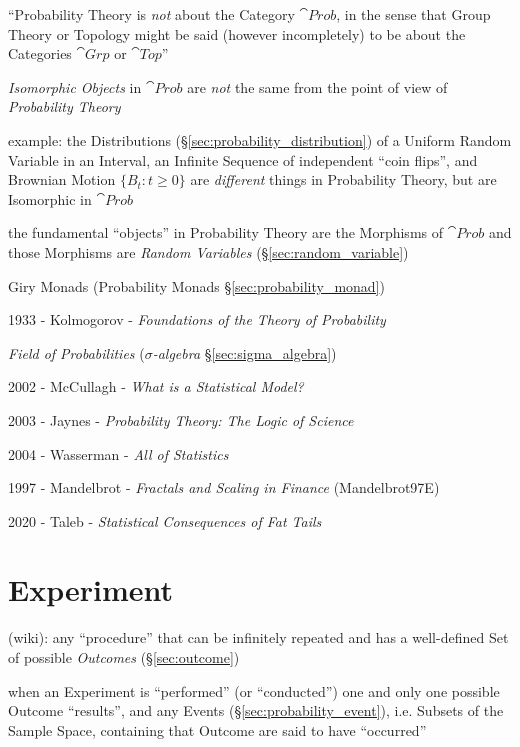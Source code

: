 ``Probability Theory is \emph{not} about the Category $\cat{Prob}$, in the sense
that Group Theory or Topology might be said (however incompletely) to be about
the Categories $\cat{Grp}$ or $\cat{Top}$''

\emph{Isomorphic Objects} in $\cat{Prob}$ are \emph{not} the same from the point
of view of \emph{Probability Theory}

example: the Distributions (\S\ref{sec:probability_distribution}) of a Uniform
Random Variable in an Interval, an Infinite Sequence of independent ``coin
flips'', and Brownian Motion $\{B_t : t \geq 0\}$ are \emph{different} things in
Probability Theory, but are Isomorphic in $\cat{Prob}$

the fundamental ``objects'' in Probability Theory are the Morphisms of
$\cat{Prob}$ and those Morphisms are \emph{Random Variables}
(\S\ref{sec:random_variable})

\fist Giry Monads (Probability Monads \S\ref{sec:probability_monad})

\asterism

1933 - Kolmogorov - \emph{Foundations of the Theory of Probability}

\emph{Field of Probabilities} (\emph{$\sigma$-algebra}
\S\ref{sec:sigma_algebra})

\asterism

2002 - McCullagh - \emph{What is a Statistical Model?}

2003 - Jaynes - \emph{Probability Theory: The Logic of Science}

2004 - Wasserman - \emph{All of Statistics}

\asterism

1997 - Mandelbrot - \emph{Fractals and Scaling in Finance} (Mandelbrot97E)

2020 - Taleb - \emph{Statistical Consequences of Fat Tails}



\section{Experiment}\label{sec:experiment}

(wiki): any ``procedure'' that can be infinitely repeated and has a well-defined
Set of possible \emph{Outcomes} (\S\ref{sec:outcome})

when an Experiment is ``performed'' (or ``conducted'') one and only one possible
Outcome ``results'', and any Events (\S\ref{sec:probability_event}), i.e.
Subsets of the Sample Space, containing that Outcome are said to have
``occurred''


